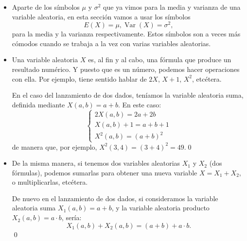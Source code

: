 \begin{itemize}

\item Aparte de los símbolos $\mu$ y $\sigma^2$ que ya vimos para la media y varianza de una variable aleatoria, en esta sección vamos a usar los símbolos
    \[E(X)=\mu, \operatorname{Var}(X)=\sigma^2,\]
    para la media y la varianza respectivamente. Estos símbolos son a veces más cómodos cuando se trabaja a la vez con varias variables aleatorias.

\item Una variable aleatoria $X$ es, al fin y al cabo, una fórmula que produce un resultado numérico. Y puesto que es un número, podemos hacer operaciones con ella. Por ejemplo, tiene sentido hablar de $2X$, $X+1$, $X^2$, etcétera.
    \begin{Ejemplo}
    En el caso del lanzamiento de dos dados, teníamos la variable aleatoria suma, definida mediante $X(a,b)=a+b$. En este caso:
    \[
    \begin{cases}
    2X(a,b)=2a+2b\\[2mm]
    X(a,b)+1=a+b+1\\[2mm]
    X^2(a,b)=(a+b)^2
    \end{cases}
    \]
    de manera que, por ejemplo, $X^2(3,4)=(3+4)^2=49$.\qed
    \end{Ejemplo}

    \item De la misma manera, si tenemos dos variables aleatorias $X_1$ y $X_2$ (dos fórmulas), podemos sumarlas para obtener una nueva variable $X=X_1+X_2$, o multiplicarlas, etcétera.
    \begin{Ejemplo}
    De nuevo en el lanzamiento de dos dados, si consideramos la variable aleatoria suma $X_1(a,b)=a+b$, y la variable aleatoria producto $X_2(a,b)=a\cdot b$, sería:
    \[X_1(a,b)+X_2(a,b)=(a+b)+a\cdot b.\]
    \qed
    \end{Ejemplo}


\end{itemize}

